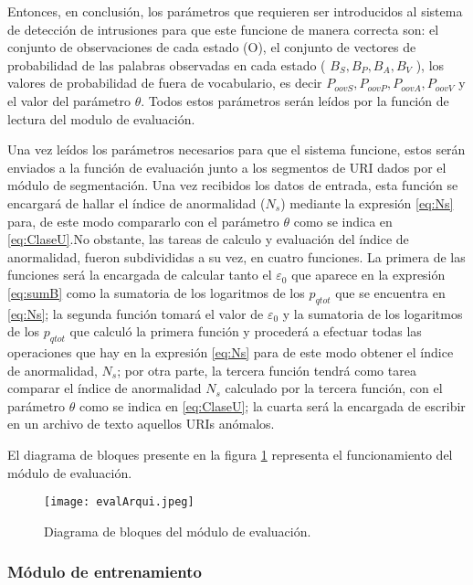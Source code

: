     Entonces, en conclusión, los parámetros que requieren ser introducidos al sistema de detección de intrusiones para que este funcione de manera correcta son: el conjunto de observaciones de cada estado (O), el conjunto de vectores de probabilidad de las palabras observadas en cada estado ( $B_{S}, B_{P}, B_{A}, B_{V}$ ), los valores de probabilidad de fuera de vocabulario, es decir $P_{oovS}, P_{oovP}, P_{oovA}, P_{oovV}$ y el valor del parámetro $\theta$. Todos estos parámetros serán leídos por la función de lectura del modulo de evaluación.
    
Una vez leídos los parámetros necesarios para que el sistema funcione, estos serán enviados a la función de evaluación junto a los segmentos de URI dados por el módulo de segmentación. Una vez recibidos los datos de entrada, esta función se encargará de hallar el índice de anormalidad ($N_{s}$) mediante la expresión \ref{eq:Ns} para, de este modo compararlo con el parámetro $\theta$ como se indica en \ref{eq:ClaseU}.No obstante, las tareas de calculo y evaluación del índice de anormalidad, fueron subdivididas a su vez, en cuatro funciones. La primera de las funciones será la encargada de calcular tanto el $\varepsilon_{0}$ que aparece en la expresión \ref{eq:sumB} como la sumatoria de los logaritmos de los $p_{qtot}$ que se encuentra en \ref{eq:Ns}; la segunda función tomará el valor de $\varepsilon_{0}$ y la sumatoria de los logaritmos de los $p_{qtot}$ que calculó la primera función y procederá a efectuar todas las operaciones que hay en la expresión \ref{eq:Ns} para de este modo obtener el índice de anormalidad, $N_{s}$; por otra parte, la tercera función tendrá como tarea comparar el índice de anormalidad $N_{s}$ calculado por la tercera función, con el parámetro $\theta$ como se indica en \ref{eq:ClaseU}; la cuarta será la encargada de escribir en un archivo de texto aquellos URIs anómalos.

El diagrama de bloques presente en la figura \ref{fig:arquiEvaluacion} representa el funcionamiento del módulo de evaluación.

\begin{figure}[tb]
\begin{center}
\texttt{[image: evalArqui.jpeg]}
\caption{Diagrama de bloques del módulo de evaluación.}
\label{fig:arquiEvaluacion}
\end{center}
\end{figure}

\subsubsection{Módulo de entrenamiento}\label{sec:entrenamiento}


